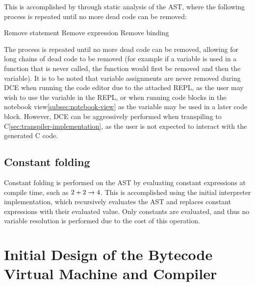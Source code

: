 This is accomplished by through static analysis of the AST, where the following process is repeated until no more dead
code can be removed:

\begin{algorithmic}
                    \State Remove statement
                \EndIf
                    \State Remove expression
                \EndIf
                    \State Remove binding
                \EndIf
            \EndIf
        \EndFor
    \EndWhile
\end{algorithmic}

The process is repeated until no more dead code can be removed, allowing for long chains of dead code to be 
removed (for example if a variable is used in a function that is never called, the function would first be removed
and then the variable).
It is to be noted that variable assignments are never removed during DCE when running the code editor due to the 
attached REPL, as the user may wish to use the variable in the REPL\@, or when running code blocks in the notebook 
view\ref{subsec:notebook-view} as the variable may be used in a later code block.
However, DCE can be aggressively performed when transpiling to C\ref{sec:transpiler-implementation}, as the user is not expected to 
interact with the generated C code.

\subsection{Constant folding}\label{subsec:constant-folding}

Constant folding is performed on the AST by evaluating constant expressions at compile time, such as $2 + 2 \rightarrow 4$.
This is accomplished using the initial interpreter implementation, which recursively evaluates the AST and replaces
constant expressions with their evaluated value.
Only constants are evaluated, and thus no variable resolution is performed due to the cost of this operation.

\section{Initial Design of the Bytecode Virtual Machine and Compiler}\label{sec:initial-design-of-the-bytecode-virtual-machine-and-compiler}

